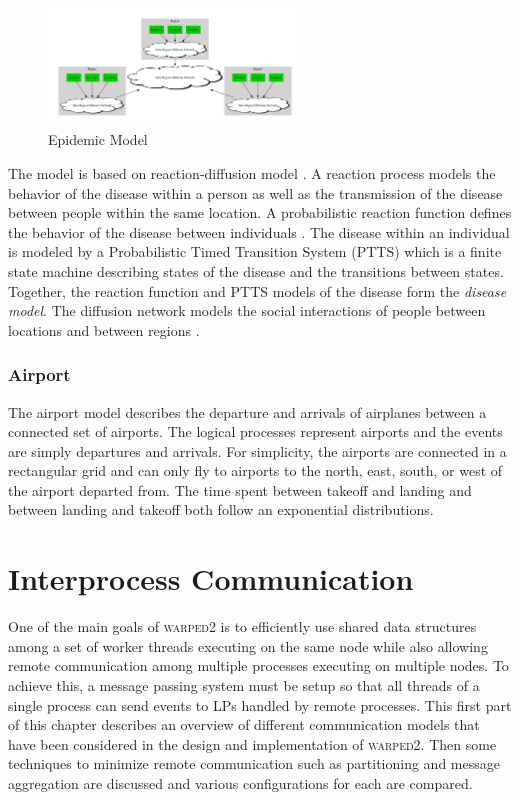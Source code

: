\documentclass[11pt]{book}
\begin{document}
\begin{figure}
    \centering
    \includegraphics[width=0.6\textwidth,quiet]{figs/graphviz/epidemic.pdf}
    \caption{Epidemic Model}\label{epidemic_model}
\end{figure}

The model is based on reaction-diffusion model \cite{perumalla-12}.  A reaction process models the
behavior of the disease within a person as well as the transmission of the disease between people
within the same location.  A probabilistic reaction function defines the behavior of the disease
between individuals \cite{barrett-08}.  The disease within an individual is modeled by a
Probabilistic Timed Transition System (PTTS) \cite{barrett-08} which is a finite state machine
describing states of the disease and the transitions between states.  Together, the reaction
function and PTTS models of the disease form the \emph{disease model}.  The diffusion network models
the social interactions of people between locations and between regions \cite{barrett-08}.

\subsection{Airport}

The airport model describes the departure and arrivals of airplanes between a connected set of
airports.  The logical processes represent airports and the events are simply departures and
arrivals.  For simplicity, the airports are connected in a rectangular grid and can only fly to
airports to the north, east, south, or west of the airport departed from.  The time spent between
takeoff and landing and between landing and takeoff both follow an exponential distributions.



\chapter[Communication]{Interprocess Communication} \label{partitioning_communication}

One of the main goals of \textsc{warped2} is to efficiently use shared data structures among a set
of worker threads executing on the same node while also allowing remote communication among multiple
processes executing on multiple nodes.  To achieve this, a message passing system must be setup so
that all threads of a single process can send events to LPs handled by remote processes.  This first
part of this chapter describes an overview of different communication models that have been
considered in the design and implementation of \textsc{warped2}.  Then some techniques to minimize
remote communication such as partitioning and message aggregation are discussed and various
configurations for each are compared.
\end{document}

